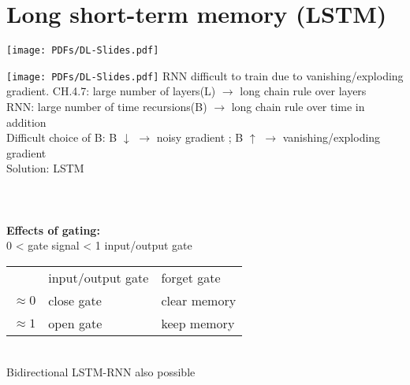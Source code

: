 \section{Long short-term memory (LSTM)}
\texttt{[image: PDFs/DL-Slides.pdf]}

\texttt{[image: PDFs/DL-Slides.pdf]}
RNN difficult to train due to vanishing/exploding gradient. CH.4.7: large number of layers(L) $ \rightarrow $ long chain rule over layers \\
RNN: large number of time recursions(B) $ \rightarrow $ long chain rule over time in addition\\
Difficult choice of B: B $ \downarrow $ $ \rightarrow $ noisy gradient ; B $  \uparrow $ $ \rightarrow $ vanishing/exploding gradient\\
Solution: LSTM\\
\\
\\
   \\
\textbf{Effects of gating:}\\
0 < gate signal < 1 input/output gate \\
\begin{tabular}{lll}
	& input/output gate & forget gate \\
	$ \approx 0  $& close gate & clear memory \\
	$ \approx 1  $& open gate & keep memory 
\end{tabular}\\
Bidirectional LSTM-RNN also possible\\










